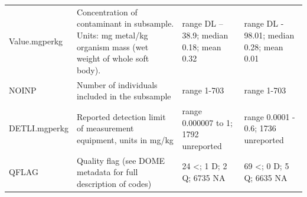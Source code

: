\documentclass[
  12pt,
]{article}
\begin{document}
\begin{longtable}[]{@{}llll@{}}
\begin{minipage}[t]{0.15\columnwidth}
Value.mgperkg\strut
\end{minipage} & \begin{minipage}[t]{0.22\columnwidth}\raggedright
Concentration of contaminant in subsample. Units: mg metal/kg organism
mass (wet weight of whole soft body).\strut
\end{minipage} & \begin{minipage}[t]{0.25\columnwidth}\raggedright
range DL -- 38.9; median 0.18; mean 0.32\strut
\end{minipage} & \begin{minipage}[t]{0.25\columnwidth}\raggedright
range DL - 98.01; median 0.28; mean 0.01\strut
\end{minipage}\tabularnewline
\begin{minipage}[t]{0.15\columnwidth}\raggedright
NOINP\strut
\end{minipage} & \begin{minipage}[t]{0.22\columnwidth}\raggedright
Number of individuals included in the subsample\strut
\end{minipage} & \begin{minipage}[t]{0.25\columnwidth}\raggedright
range 1-703\strut
\end{minipage} & \begin{minipage}[t]{0.25\columnwidth}\raggedright
range 1-703\strut
\end{minipage}\tabularnewline
\begin{minipage}[t]{0.15\columnwidth}\raggedright
DETLI.mgperkg\strut
\end{minipage} & \begin{minipage}[t]{0.22\columnwidth}\raggedright
Reported detection limit of measurement equipment, units in mg/kg\strut
\end{minipage} & \begin{minipage}[t]{0.25\columnwidth}\raggedright
range 0.000007 to 1; 1792 unreported\strut
\end{minipage} & \begin{minipage}[t]{0.25\columnwidth}\raggedright
range 0.0001 - 0.6; 1736 unreported\strut
\end{minipage}\tabularnewline
\begin{minipage}[t]{0.15\columnwidth}\raggedright
QFLAG\strut
\end{minipage} & \begin{minipage}[t]{0.22\columnwidth}\raggedright
Quality flag (see DOME metadata for full description of codes)\strut
\end{minipage} & \begin{minipage}[t]{0.25\columnwidth}\raggedright
24 \textless; 1 D; 2 Q; 6735 NA\strut
\end{minipage} & \begin{minipage}[t]{0.25\columnwidth}\raggedright
69 \textless; 0 D; 5 Q; 6635 NA\strut
\end{minipage}\tabularnewline
\bottomrule
\end{longtable}
\end{document}
